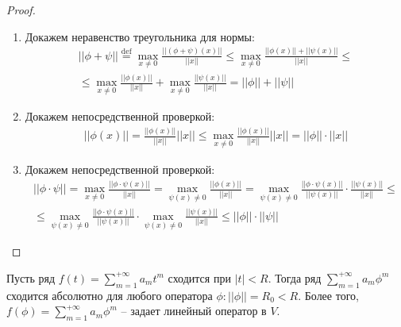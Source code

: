 \begin{proof}~
    \begin{enumerate}
        \item Докажем неравенство треугольника для нормы:
        \begin{multline*}
            ||\phi + \psi|| \overset{\text{def}}{=} \underset{x \neq 0}{\max} 
            \frac{||(\phi + \psi)(x)||}{||x||} \leq \underset{x \neq 0}{\max} 
            \frac{||\phi(x)|| + ||\psi(x)||}{||x||} \leq \\ \leq \underset{x \neq 0}{\max} 
            \frac{||\phi(x)||}{||x||} + \underset{x \neq 0}{\max} 
            \frac{||\psi(x)||}{||x||} = ||\phi|| + ||\psi||
        \end{multline*} 

        \item Докажем непосредственной проверкой:
        \begin{eqnarray*}
            ||\phi(x)|| = \frac{||\phi(x)||}{||x||} ||x|| \leq  \underset{x \neq 0}{\max} 
            \frac{||\phi(x)||}{||x||} ||x|| = ||\phi|| \cdot ||x||
        \end{eqnarray*}
        \item Докажем непосредственной проверкой:
        \begin{multline*}
            ||\phi \cdot \psi|| = \underset{x \neq 0}{\max} \frac{||\phi \cdot \psi(x)||}{||x||} = 
            \underset{\psi(x) \neq 0}{\max} \frac{||\phi(x)||}{||x||} =
            \underset{\psi(x) \neq 0}{\max} \frac{||\phi \cdot \psi(x)||}{||\psi(x)||} \cdot 
            \frac{||\psi(x)||}{||x||} \leq \\ \leq \underset{\psi(x) \neq 0}{\max} 
            \frac{||\phi \cdot \psi(x)||}{||\psi(x)||} \cdot \underset{\psi(x) \neq 0}{\max} 
            \frac{||\psi(x)||}{||x||} \leq ||\phi|| \cdot ||\psi||
        \end{multline*}
    \end{enumerate}
\end{proof}

\begin{theorem}
    Пусть ряд $f(t) = \displaystyle\sum_{m=1}^{+\infty} a_m t^m$ сходится при $|t| < R$.
    Тогда ряд $\displaystyle\sum_{m=1}^{+\infty} a_m \phi^m$ сходится абсолютно для любого оператора 
    $\phi: ||\phi|| = R_0 < R$. Более того, $f(\phi) = \displaystyle\sum_{m=1}^{+\infty} a_m \phi^m$ 
    -- задает линейный оператор в $V$.
\end{theorem}

